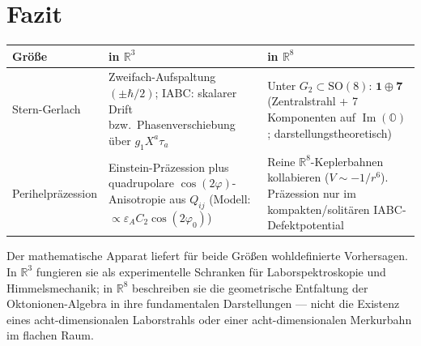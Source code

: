 \documentclass[11pt,a4paper]{article}
\theoremstyle{definition}
\theoremstyle{remark}
\newcommand{\ImO}{\operatorname{Im}}
\newcommand{\R}{\mathbb{R}}
\newcommand{\OO}{\mathbb{O}}
\begin{document}
\section{Fazit}

\begin{center}
\small
\renewcommand{\arraystretch}{1.3}
\begin{tabular}{@{}>{\raggedright\arraybackslash}p{}
                >{\raggedright\arraybackslash}p{}
                >{\raggedright\arraybackslash}p{}@{}}
\toprule
\textbf{Größe} & \textbf{in \(\R^3\)} & \textbf{in \(\R^8\)} \\
\midrule
Stern-Gerlach &
Zweifach-Aufspaltung \((\pm\hbar/2)\); IABC: skalarer Drift bzw.\ Phasenverschiebung über \(g_1 X^a\tau_a\) &
Unter \(G_2\subset\mathrm{SO}(8)\): \(\mathbf{1}\oplus\mathbf{7}\) (Zentralstrahl + 7 Komponenten auf \(\ImO(\OO)\); darstellungstheoretisch) \\
\addlinespace
Perihel\-präzession &
Einstein-Präzession plus quadrupolare \(\cos(2\varphi)\)-Anisotropie aus \(Q_{ij}\) (Modell: \(\propto\varepsilon_A C_2\cos(2\varphi_0)\)) &
Reine \(\R^8\)-Keplerbahnen kollabieren (\(V\sim -1/r^6\)). Präzession nur im kompakten/solitären IABC-Defektpotential \\
\bottomrule
\end{tabular}
\end{center}

\medskip
Der mathematische Apparat liefert für beide Größen wohldefinierte Vorhersagen. In \(\R^3\)
fungieren sie als experimentelle Schranken für Laborspektroskopie und Himmelsmechanik; in
\(\R^8\) beschreiben sie die geometrische Entfaltung der Oktonionen-Algebra in ihre
fundamentalen Darstellungen --- nicht die Existenz eines acht-dimensionalen
Laborstrahls oder einer acht-dimensionalen Merkurbahn im flachen Raum.
\end{document}
